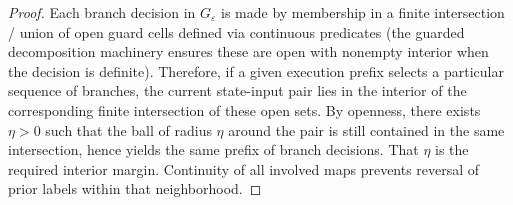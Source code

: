 \documentclass[12pt]{article}
\theoremstyle{definition}
\theoremstyle{plain}
\begin{document}
\begin{proof}
Each branch decision in \(G_\varepsilon\) is made by membership in a finite intersection / union of open guard cells defined via continuous predicates (the guarded decomposition machinery ensures these are open with nonempty interior when the decision is definite). Therefore, if a given execution prefix selects a particular sequence of branches, the current state-input pair lies in the interior of the corresponding finite intersection of these open sets. By openness, there exists \(\eta>0\) such that the ball of radius \(\eta\) around the pair is still contained in the same intersection, hence yields the same prefix of branch decisions. That \(\eta\) is the required interior margin. Continuity of all involved maps prevents reversal of prior labels within that neighborhood.
\end{proof}
\end{document}
